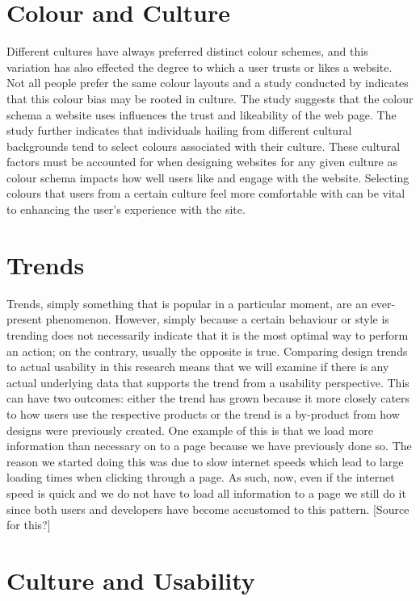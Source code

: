 \section{Colour and Culture}
Different cultures have always preferred distinct colour schemes, and this variation has also effected the degree to which a user trusts or likes a website. Not all people prefer the same colour layouts and a study conducted by \citeauthor{Color} \cite{Color} indicates that this colour bias may be rooted in culture. The study suggests that the colour schema a website uses influences the trust and likeability of the web page. The study further indicates that individuals hailing from different cultural backgrounds tend to select colours associated with their culture. These cultural factors must be accounted for when designing websites for any given culture as colour schema impacts how well users like and engage with the website. Selecting colours that users from a certain culture feel more comfortable with can be vital to enhancing the user's experience with the site.
\section{Trends}
Trends, simply something that is popular in a particular moment, are an ever-present phenomenon. However, simply because a certain behaviour or style is trending does not necessarily indicate that it is the most optimal way to perform an action; on the contrary, usually the opposite is true. Comparing design trends to actual usability in this research means that we will examine if there is any actual underlying data that supports the trend from a usability perspective. This can have two outcomes: either the trend has grown because it more closely caters to how users use the respective products or the trend is a by-product from how designs were previously created. One example of this is that we load more information than necessary on to a page because we have previously done so. The reason we started doing this was due to slow internet speeds which lead to large loading times when clicking through a page. As such, now, even if the internet speed is quick and we do not have to load all information to a page we still do it since both users and developers have become accustomed to this pattern.
[Source for this?]

\section{Culture and Usability}

